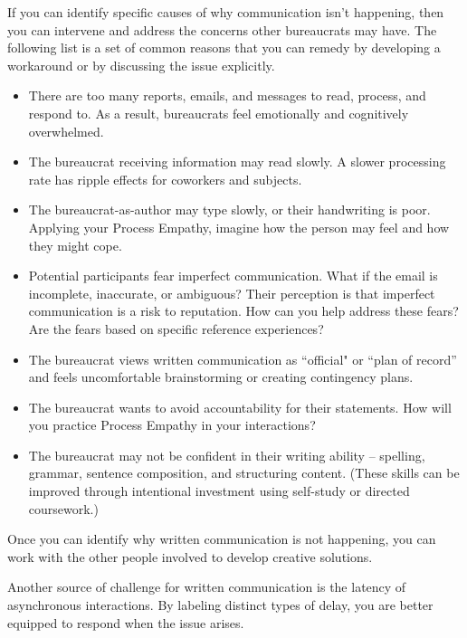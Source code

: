 If you can identify specific causes of why communication isn't happening, then you can intervene and address the concerns other bureaucrats may have. The following list is a set of common reasons that you can remedy by developing a workaround or by discussing the issue explicitly. 
\begin{itemize}
    \item There are too many reports, emails, and messages to read, process, and respond to. As a result, bureaucrats feel emotionally and cognitively overwhelmed.
\item The bureaucrat receiving information may read slowly. A slower processing rate has ripple effects for coworkers and subjects.
\item The bureaucrat-as-author may type slowly, or their handwriting is poor. Applying your Process Empathy, imagine how the person may feel and how they might cope.
\item Potential participants fear imperfect communication. What if the email is incomplete, inaccurate, or ambiguous? Their perception is that imperfect communication is a risk to reputation. How can you help address these fears? Are the fears based on specific reference experiences?
\item The bureaucrat views written communication as ``official" or ``plan of record'' and feels uncomfortable brainstorming or creating contingency plans.
\item The bureaucrat wants to avoid accountability for their statements. How will you practice Process Empathy in your interactions?
\item The bureaucrat may not be confident in their writing ability -- spelling, grammar, sentence composition, and structuring content. (These skills can be improved through intentional investment using self-study or directed coursework.) %
\end{itemize}
Once you can identify why written communication is not happening, you can work with the other people involved to develop creative solutions. 

Another source of challenge for written communication is the latency of asynchronous interactions. By labeling distinct types of delay, you are better equipped to respond when the issue arises. 



